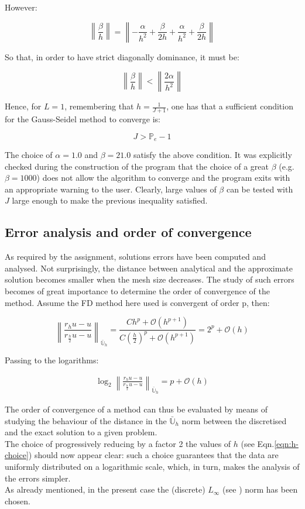 \documentclass[11pt]{article}
\theoremstyle{theorem}
\theoremstyle{definition}
\begin{document}
However:

$$\left\|\frac{\beta}{h}\right\|= \left\|-\frac{\alpha}{h^2}+\frac{\beta}{2h}+\frac{\alpha}{h^2}+\frac{\beta}{2h}\right\|$$

So that, in order to have strict diagonally dominance, it must be:

$$\left\|\frac{\beta}{h}\right\|<\left\|\frac{2\alpha}{h^2}\right\|$$

Hence, for $L=1$, remembering that $h=\frac{1}{J+1}$, one has that a sufficient condition for the Gauss-Seidel method to converge is:

$$J>\mathbb{P}_e-1$$

The choice of $\alpha=1.0$ and $\beta=21.0$ satisfy the above condition. It was explicitly checked during the construction of the program that the choice of a great $\beta$ (e.g. $\beta=1000$) does not allow the algorithm to converge and the program exits with an appropriate warning to the user. Clearly, large values of $\beta$ can be tested with $J$ large enough to make the previous inequality satisfied.\\

\subsection{Error analysis and order of convergence}
\label{subsec:Error}
As required by the assignment, solutions errors have been computed and analysed. Not surprisingly, the distance between analytical and the approximate solution becomes smaller when the mesh size decreases. The study of such errors becomes of great importance to determine the order of convergence of the method. Assume the FD method here used is convergent of order p, then:

$$\left\|\frac{r_hu-u}{r_{\frac{h}{2}}u-u}\right\|_{\bar{\mathbb{U}}_h}=\frac{Ch^p+\mathcal{O}(h^{p+1})}{C\left(\frac{h}{2}\right)^p+\mathcal{O}(h^{p+1})}= 2^p+\mathcal{O}(h)$$

Passing to the logarithms:

\begin{align}
	\label{eqn:log-conv}
	\log_2\left\|\frac{r_hu-u}{r_{\frac{h}{2}}u-u}\right\|_{\bar{\mathbb{U}}_h}=p+\mathcal{O}(h)
\end{align}

The order of convergence of a method can thus be evaluated by means of studying the behaviour of the distance in the $\bar{\mathbb{U}}_h$ norm between the discretised and the exact solution to a given problem.\\
The choice of progressively reducing by a factor 2 the values of $h$ (see Eqn.\eqref{eqn:h-choice}) should now appear clear: such a choice guarantees that the data are uniformly distributed on a logarithmic scale, which, in turn, makes the analysis of the errors simpler.\\
As already mentioned, in the present case the (discrete) $L_{\infty}$ (see \cite{lec-notes}) norm has been chosen.\\
\end{document}
